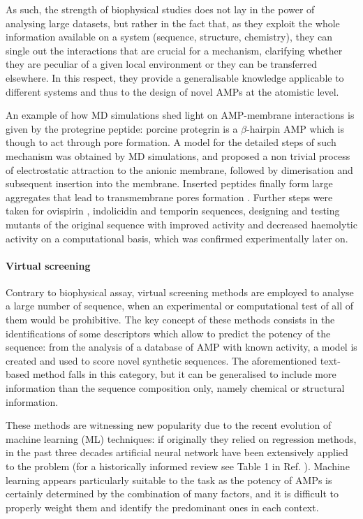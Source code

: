 As such, the strength of biophysical studies does not lay in the power of analysing large datasets, but rather in the fact that, as they exploit the whole information available on a system (sequence, structure, chemistry), they can single out the interactions that are crucial for a mechanism, clarifying whether they are peculiar of a given local environment or they can be transferred elsewhere. In this respect, they provide a generalisable knowledge applicable to different systems and thus to the design of novel AMPs at the atomistic level.

An example of how MD simulations shed light on AMP-membrane interactions is given by the protegrine peptide: porcine protegrin is a $\beta$-hairpin AMP which is though to act through pore formation. A model for the detailed steps of such mechanism was obtained by MD simulations, and proposed a non trivial process of electrostatic attraction to the anionic membrane, followed by dimeri­sation and subsequent insertion into the membrane. Inserted peptides finally form large aggregates that lead to transmem­brane pores formation \cite{Bolintineanu2011}.
%
Further steps were taken for ovispirin \cite{Khandelia2005}, indolicidin \cite{Tsai2009} and temporin \cite{Farrotti2017} sequences, designing and testing mutants of the original sequence with improved activity and decreased haemolytic activity on a computational basis, which was confirmed experimentally later on.

\paragraph{Virtual screening}
Contrary to biophysical assay, virtual screening methods are employed to analyse a large number of sequence, when an experimental or computational test of all of them would be prohibitive. The key concept of these methods consists in the identifications of some descriptors which allow to predict the potency of the sequence: from the analysis of a database of AMP with known activity, a model is created and used to score novel synthetic sequences. The aforementioned text-based method falls in this category, but it can be generalised to include more information than the sequence composition only, namely chemical or structural information.

These methods are witnessing new popularity due to the recent evolution of machine learning (ML) techniques: if originally they relied on regression methods, in the past three decades artificial neural network have been extensively applied to the problem (for a historically informed review see Table 1 in Ref. \cite{Fjell2011}). Machine learning appears particularly suitable to the task as the potency of AMPs is certainly determined by the combination of many factors, and it is difficult to properly weight them and identify the predominant ones in each context.

